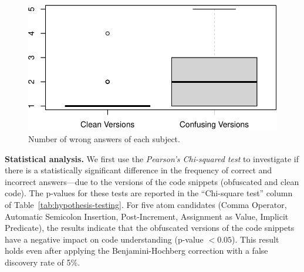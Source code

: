 \begin{figure}[b!]
\noindent
 \centering
 \includegraphics[width=0.6\columnwidth]{images/wrong-answers-plot-1.pdf}
 \caption{Number of wrong answers of each subject.}
 \label{fig:boxplotcorrectness}
 \end{figure}%
 

{\bf Statistical analysis.}
We first use the \emph{Pearson's Chi-squared test}
to investigate if there is a statistically significant difference in the frequency of correct and incorrect answers---due to the versions of the code snippets (obfuscated and clean code). The p-values for these tests are reported in the ``Chi-square test'' column of Table~\ref{tab:hypothesis-testing}. For five atom candidates (Comma Operator, Automatic Semicolon Insertion, Post-Increment, Assignment as Value, Implicit Predicate), the results indicate that the obfuscated versions of the code snippets have a negative impact on code understanding (p-value $< 0.05$). This result holds even after applying the Benjamini-Hochberg correction with a false discovery rate of 5\%. 

